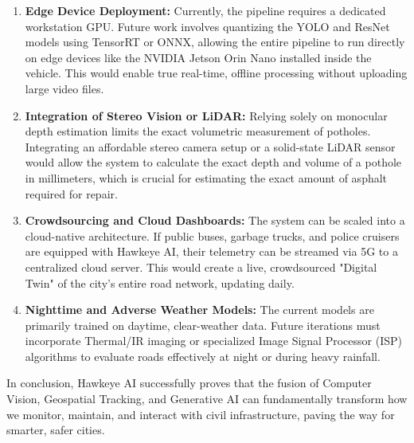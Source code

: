 \begin{enumerate}
    \item \textbf{Edge Device Deployment:} Currently, the pipeline requires a dedicated workstation GPU. Future work involves quantizing the YOLO and ResNet models using TensorRT or ONNX, allowing the entire pipeline to run directly on edge devices like the NVIDIA Jetson Orin Nano installed inside the vehicle. This would enable true real-time, offline processing without uploading large video files.
    
    \item \textbf{Integration of Stereo Vision or LiDAR:} Relying solely on monocular depth estimation limits the exact volumetric measurement of potholes. Integrating an affordable stereo camera setup or a solid-state LiDAR sensor would allow the system to calculate the exact depth and volume of a pothole in millimeters, which is crucial for estimating the exact amount of asphalt required for repair.
    
    \item \textbf{Crowdsourcing and Cloud Dashboards:} The system can be scaled into a cloud-native architecture. If public buses, garbage trucks, and police cruisers are equipped with Hawkeye AI, their telemetry can be streamed via 5G to a centralized cloud server. This would create a live, crowdsourced "Digital Twin" of the city's entire road network, updating daily.
    
    \item \textbf{Nighttime and Adverse Weather Models:} The current models are primarily trained on daytime, clear-weather data. Future iterations must incorporate Thermal/IR imaging or specialized Image Signal Processor (ISP) algorithms to evaluate roads effectively at night or during heavy rainfall.
\end{enumerate}

In conclusion, Hawkeye AI successfully proves that the fusion of Computer Vision, Geospatial Tracking, and Generative AI can fundamentally transform how we monitor, maintain, and interact with civil infrastructure, paving the way for smarter, safer cities.

\lipsum[31-33] %
